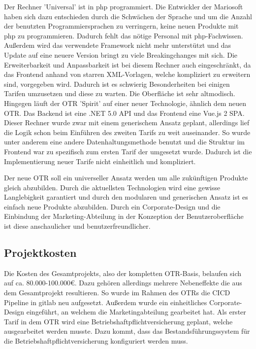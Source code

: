 Der Rechner 'Universal' ist in \gls{php} programmiert. Die Entwickler der Mariosoft haben sich dazu entschieden durch die Schwächen der Sprache und um die Anzahl der benutzten Programmiersprachen zu verringern, keine neuen Produkte mit \gls{php} zu programmieren. Dadurch fehlt das nötige Personal mit \gls{php}-Fachwissen. Außerdem wird das verwendete Framework nicht mehr unterstützt und das Update auf eine neuere Version bringt zu viele Breakingchanges mit sich. Die Erweiterbarkeit und Anpassbarkeit ist bei diesem Rechner auch eingeschränkt, da das Frontend anhand von starren XML-Vorlagen, welche kompliziert zu erweitern sind, vorgegeben wird. Dadurch ist es schwierig Besonderheiten bei einigen Tarifen umzusetzen und diese zu warten. Die Oberfläche ist sehr altmodisch. \\
Hingegen läuft der \ac{OTR} 'Spirit' auf einer neuer Technologie, ähnlich dem neuen \ac{OTR}. Das Backend ist eine .NET 5.0 API und das Frontend eine Vue.js 2 \ac{SPA}. Dieser Rechner wurde zwar mit einem generischem Ansatz geplant, allerdings lief die Logik schon beim Einführen des zweiten Tarifs zu weit auseinander. So wurde unter anderem eine andere Datenhaltungsmethode benutzt und die Struktur im Frontend war zu spezifisch zum ersten Tarif der umgesetzt wurde. Dadurch ist die Implementierung neuer Tarife nicht einheitlich und kompliziert.

Der neue \ac{OTR} soll ein universeller Ansatz werden um alle zukünftigen Produkte gleich abzubilden. Durch die aktuellsten Technologien wird eine gewisse Langlebigkeit garantiert und durch den modularen und generischen Ansatz ist es einfach neue Produkte abzubilden. Durch ein Corporate-Design und die Einbindung der Marketing-Abteilung in der Konzeption der Benutzeroberfläche ist diese anschaulicher und benutzerfreundlicher.
\subsection{Projektkosten}
\label{projektkosten}
Die Kosten des Gesamtprojekts, also der kompletten \ac{OTR}-Basis, belaufen sich auf ca. 80.000-100.000€. Dazu gehören allerdings mehrere Nebeneffekte die aus dem Gesamtprojekt resultieren. So wurde im Rahmen des \ac{OTR}s die \ac{CICD} Pipeline in \gls{gitlab} neu aufgesetzt. Außerdem wurde ein einheitliches Corporate-Design eingeführt, an welchem die Marketingabteilung gearbeitet hat. Als erster Tarif in dem \ac{OTR} wird eine Betriebshaftpflichtversicherung geplant, welche ausgearbeitet werden musste. Dazu kommt, dass das Bestandsführungssystem für die Betriebshaftpflichtversicherung konfiguriert werden muss.\\


